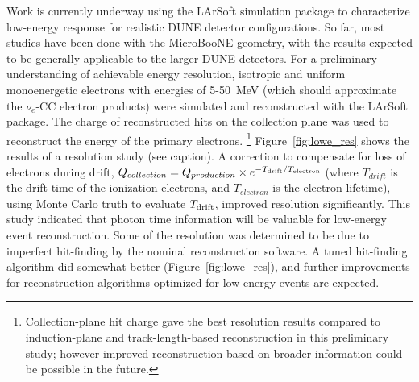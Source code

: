 Work is currently underway using the LArSoft simulation package
to characterize low-energy
response for realistic DUNE detector configurations.
So far,
most studies have been done with the MicroBooNE geometry, with the
results expected to be %
generally applicable to the larger DUNE detectors.  For a preliminary
understanding of achievable energy resolution, isotropic and uniform
monoenergetic electrons with energies of 5-50~MeV (which should
approximate the $\nu_e$-CC electron products) were simulated and
reconstructed with the LArSoft
package. 
The charge of reconstructed hits on the collection plane was used to
reconstruct the energy of the primary electrons.
\footnote{Collection-plane hit charge gave the best resolution results compared to
induction-plane and track-length-based reconstruction in this preliminary study; however improved reconstruction based on broader information could be possible in the future.}
Figure~\ref{fig:lowe_res} shows the results of a resolution study (see caption).
A correction to compensate for loss of electrons during drift,
$Q_{collection}=Q_{production}\times e^{-T_{\rm drift} / T_{\rm
    electron}}$ (where $T_{drift}$ is the drift time of the ionization
electrons, and $T_{electron}$ is the electron lifetime), using Monte
Carlo truth to evaluate $T_{\rm drift}$, improved resolution
significantly.  This study indicated that photon time information will
be valuable for low-energy event reconstruction.  Some of the
resolution was determined to be due to imperfect hit-finding by the
nominal reconstruction software.  A tuned hit-finding algorithm did
somewhat better (Figure~\ref{fig:lowe_res}), and further
improvements for reconstruction algorithms optimized for low-energy
events are expected.
%
